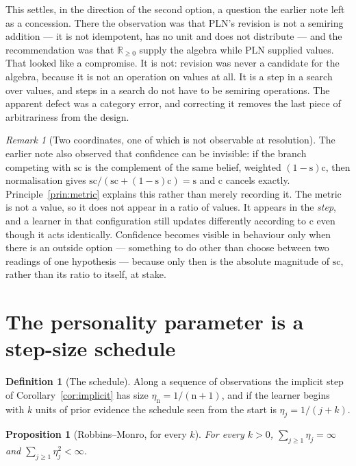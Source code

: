 \documentclass[11pt,a4paper]{article}
\theoremstyle{plain}
\newtheorem{proposition}[theorem]{Proposition}
\theoremstyle{definition}
\newtheorem{definition}[theorem]{Definition}
\theoremstyle{remark}
\newtheorem{remark}[theorem]{Remark}
\newcommand{\Rnn}{\mathbb{R}_{\geq 0}}
\newcommand{\str}{\mathrm{s}}
\newcommand{\conf}{\mathrm{c}}
\newcommand{\ev}{\mathrm{n}}
\begin{document}
This settles, in the direction of the second option, a question the earlier note
left as a concession. There the observation was that PLN's revision is not a
semiring addition --- it is not idempotent, has no unit and does not distribute
--- and the recommendation was that $\Rnn$ supply the algebra while PLN supplied
values. That looked like a compromise. It is not: revision was never a candidate
for the algebra, because it is not an operation on values at all. It is a step in
a search over values, and steps in a search do not have to be semiring
operations. The apparent defect was a category error, and correcting it removes
the last piece of arbitrariness from the design.

\begin{remark}[Two coordinates, one of which is not observable at resolution]
\label{rem:cancel}
The earlier note also observed that confidence can be invisible: if the branch
competing with $\str\conf$ is the complement of the same belief, weighted
$(1-\str)\conf$, then normalisation gives
$\str\conf/(\str\conf + (1-\str)\conf) = \str$ and $\conf$ cancels exactly.
Principle~\ref{prin:metric} explains this rather than merely recording it. The
metric is not a value, so it does not appear in a ratio of values. It appears in
the \emph{step}, and a learner in that configuration still updates differently
according to $\conf$ even though it acts identically. Confidence becomes visible
in behaviour only when there is an outside option --- something to do other than
choose between two readings of one hypothesis --- because only then is the
absolute magnitude of $\str\conf$, rather than its ratio to itself, at stake.
\end{remark}

\section{The personality parameter is a step-size schedule}\label{sec:k}

\begin{definition}[The schedule]\label{def:schedule}
Along a sequence of observations the implicit step of
Corollary~\ref{cor:implicit} has size
$\eta_\ev = 1/(\ev+1)$, and if the learner begins with $k$ units of prior
evidence the schedule seen from the start is $\eta_j = 1/(j+k)$.
\end{definition}

\begin{proposition}[Robbins--Monro, for every $k$]\label{prop:rm}
For every $k>0$, $\sum_{j\ge1}\eta_j = \infty$ and
$\sum_{j\ge1}\eta_j^2 < \infty$.
\end{proposition}
\end{document}
